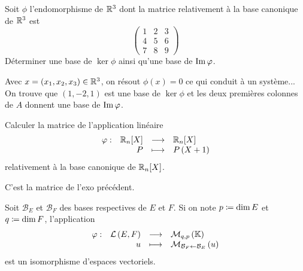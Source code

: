 \documentclass{magnolia}
\begin{document}
\begin{exos}
\exo Soit $\phi$ l'endomorphisme de $\mathbb{R}^3$ dont la matrice relativement
  à la base canonique de $\mathbb{R}^3$ est
  \[\begin{pmatrix}
    1 & 2 & 3\\
    4 & 5 & 6\\
    7 & 8 & 9
    \end{pmatrix}\]
  Déterminer une base de $\ker \phi$ ainsi qu'une base de $\operatorname{Im} \varphi$.
  \begin{sol}
  Avec $x=(x_1,x_2,x_3)\in \mathbb{R}^3$, on résout $\phi(x)=0$ ce qui conduit à un système...\\
 On trouve que $(1,-2,1)$ est une base de $\ker\phi$ et les deux premières colonnes de $A$
  donnent une base de $\operatorname{Im}\varphi$.
  \end{sol}
\exo Calculer la matrice de l'application linéaire
  \[\dspappli{\phi}{\polyR[n]}{\polyR[n]}{P}{P\p{X+1}}\]
  relativement à la base canonique de $\polyR[n]$.
  \begin{sol}
  C'est la matrice de l'exo précédent.
  \end{sol}
\end{exos}


\begin{proposition}[utile=-3]
Soit $\mathcal{B}_E$ et $\mathcal{B}_F$ des bases respectives de $E$ et $F$. Si on
note $p\coloneqq\dim E$ et $q\coloneqq\dim F$, l'application
\[\begin{array}[t]{lrcl} \displaystyle{\varphi} : & \displaystyle{\mathcal{L}\left(E,F\right)} & \longrightarrow & \displaystyle{\mathcal{M}_{q,p}\left(\ensuremath{\mathbb{K}}\right)} \\ & \displaystyle{u} & \longmapsto & \displaystyle{\mathcal{M}_{\mathcal{B}_F\gets
  \mathcal{B}_E}\left(u\right)} \end{array}\]
est un isomorphisme d'espaces vectoriels.
\end{proposition}
\end{document}
